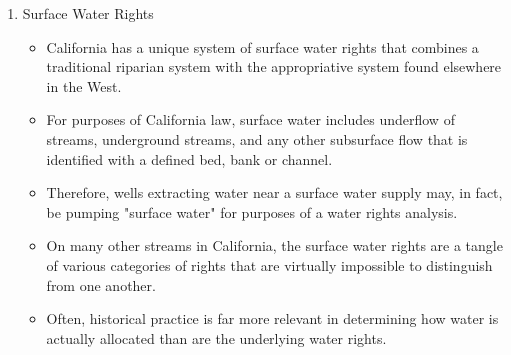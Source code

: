 \documentclass{article}
\begin{document}
\begin{enumerate}
\item Surface Water Rights 
\begin{itemize}
\item California has a unique system of surface water rights that combines a traditional riparian system with the appropriative system found elsewhere in the West.\\
\item For purposes of California law, surface water includes underflow of streams, underground streams, and any other subsurface flow that is identified with a defined bed, bank or channel. 
\item Therefore, wells extracting water near a surface water supply may, in fact, be pumping "surface water" for purposes of a water rights analysis. \\

\item On many other streams in California, the surface water rights are a tangle of various categories of rights that are virtually impossible to distinguish from one another.\\

\item Often, historical practice is far more relevant in determining how water is actually allocated than are the underlying water rights. \\


\end{itemize}
\end{enumerate}
\end{document}

